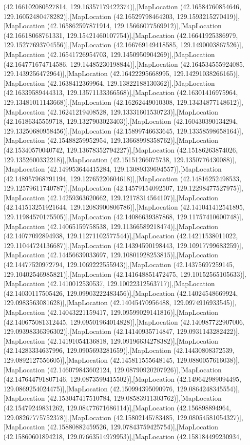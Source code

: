 (42.166102080527814, 129.16357179422374)],[MapLocation (42.16584760854646, 129.16052480478282)],[MapLocation (42.16529798464203, 129.1593215270419)],[MapLocation (42.165862597871914, 129.15666077569912)],[MapLocation (42.16618068761331, 129.15421460107754)],[MapLocation (42.16641925386979, 129.15277693704556)],[MapLocation (42.166769149418585, 129.1490003867526)],[MapLocation (42.16541726954703, 129.1450950904269)],[MapLocation (42.164771674714586, 129.14485230198844)],[MapLocation (42.164534555924085, 129.1439256472964)],[MapLocation (42.16422295668995, 129.14291038266165)],[MapLocation (42.1638412369964, 129.13822188130362)],[MapLocation (42.16339589444313, 129.13571133366568)],[MapLocation (42.16301416975964, 129.13481011143668)],[MapLocation (42.16262449010308, 129.13434877148612)],[MapLocation (42.16241219408528, 129.13331601530723)],[MapLocation (42.16186345559718, 129.1327903023403)],[MapLocation (42.160430390134294, 129.13250680958456)],[MapLocation (42.15899746633645, 129.13358598658164)],[MapLocation (42.15488259952954, 129.13668998358762)],[MapLocation (42.15340570040742, 129.13678352794227)],[MapLocation (42.15186263874026, 129.1352600332218)],[MapLocation (42.15151266075738, 129.1350776430088)],[MapLocation (42.149953644415284, 129.13089339694557)],[MapLocation (42.148957968791194, 129.12765220604618)],[MapLocation (42.14816252498533, 129.12579611740787)],[MapLocation (42.14579154092507, 129.12298477527975)],[MapLocation (42.14259363620662, 129.12178314564107)],[MapLocation (42.141513251921644, 129.12083900806786)],[MapLocation (42.141041412541895, 129.11984570175505)],[MapLocation (42.14086639387868, 129.11757410600748)],[MapLocation (42.14065159758538, 129.11366589218474)],[MapLocation (42.14077092894938, 129.11271102577544)],[MapLocation (42.14211538011022, 129.11044724136687)],[MapLocation (42.14394590198443, 129.10917799683259)],[MapLocation (42.14456639033697, 129.10801928253815)],[MapLocation (42.14477520972794, 129.1069222555943)],[MapLocation (42.14375697259145, 129.10402546985821)],[MapLocation (42.141648851472475, 129.10152565105633)],[MapLocation (42.1410012530537, 129.10022312563717)],[MapLocation (42.14030117505426, 129.09903222483456)],[MapLocation (42.14024548669924, 129.0983563081628)],[MapLocation (42.14045470956488, 129.0974916933545)],[MapLocation (42.14043221159417, 129.09599029141816)],[MapLocation (42.140675081312445, 129.09501964014828)],[MapLocation (42.140987722907006, 129.09398336396302)],[MapLocation (42.14140935714847, 129.0931143282422)],[MapLocation (42.14191054136818, 129.09196634278382)],[MapLocation (42.14283334637996, 129.0905693281659)],[MapLocation (42.14430808372539, 129.0892127556605)],[MapLocation (42.145811555648145, 129.0880057616038)],[MapLocation (42.146079843602124, 129.08790920207926)],[MapLocation (42.147644791807146, 129.0873599415502)],[MapLocation (42.149642989094495, 129.0869254024475)],[MapLocation (42.150994395090976, 129.0864248345554)],[MapLocation (42.153047417510784, 129.08583911303762)],[MapLocation (42.15479249831262, 129.08477671686114)],[MapLocation (42.156898894964, 129.08267775752378)],[MapLocation (42.15802145783485, 129.08054581054327)],[MapLocation (42.15880882459526, 129.07843759425754)],[MapLocation (42.15860601894218, 129.07663514979953)],[MapLocation (42.158184499230934, 